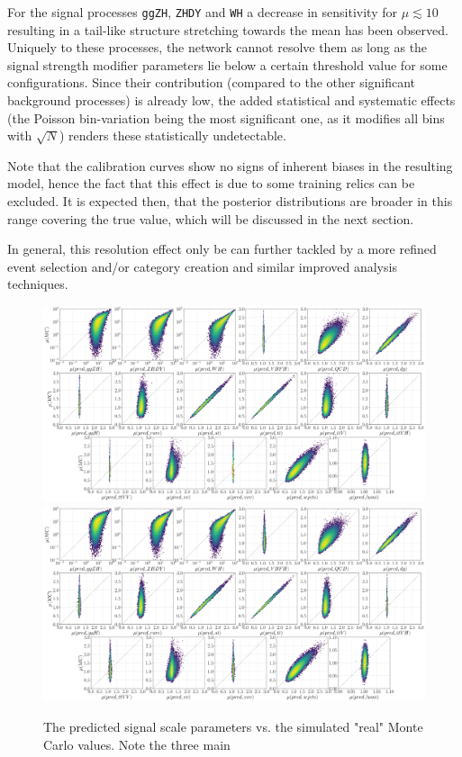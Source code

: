 For the signal processes \texttt{ggZH}, \texttt{ZHDY} and \texttt{WH} a decrease in sensitivity for $\mu\lesssim10$ resulting in a tail-like structure stretching towards the mean has been observed. Uniquely to these processes, the network cannot resolve them as long as the signal strength modifier parameters lie below a certain threshold value for some configurations. Since their contribution (compared to the other significant background processes) is already low, the added statistical and systematic effects (the Poisson bin-variation being the most significant one, as it modifies all bins with $\sqrt{N}$) renders these statistically undetectable.

Note that the calibration curves show no signs of inherent biases in the resulting model, hence the fact that this effect is due to some training relics can be excluded. It is expected then, that the posterior distributions are broader in this range covering the true value, which will be discussed in the next section.

In general, this resolution effect only be can further tackled by a more refined event selection and/or category creation and similar improved analysis techniques.

\begin{figure}[h!]
	\centering
	\includegraphics[width=\linewidth]{figures/inference/p}
	\includegraphics[width=\linewidth]{figures/inference/p_SN}
	\caption{The predicted signal scale parameters vs. the simulated "real" Monte Carlo values. Note the three main }
	\label{fig:predictions}
\end{figure}

